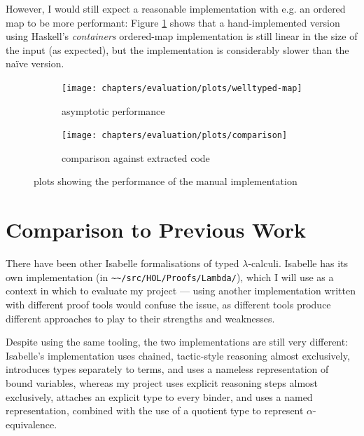 However, I would still expect a reasonable implementation with e.g. an ordered map to be more performant: Figure \ref{fig:results-map} shows that a hand-implemented version using Haskell's \emph{containers} ordered-map implementation is still linear in the size of the input (as expected), but the implementation is considerably slower than the na\"ive version.

\begin{figure}
\begin{subfigure}{.49\textwidth}
 \centering
 \texttt{[image: chapters/evaluation/plots/welltyped-map]}
 \caption{asymptotic performance}
\end{subfigure}
\begin{subfigure}{.49\textwidth}
 \centering
 \texttt{[image: chapters/evaluation/plots/comparison]}
 \caption{comparison against extracted code}
\end{subfigure}
\caption{plots showing the performance of the manual implementation}
\label{fig:results-map}
\end{figure}

\section{Comparison to Previous Work}
There have been other Isabelle formalisations of typed \(\lambda\)-calculi.
Isabelle has its own implementation (in \texttt{\textasciitilde\textasciitilde/src/HOL/Proofs/Lambda/}), which I will use as a context in which to evaluate my project --- using another implementation written with different proof tools would confuse the issue, as different tools produce different approaches to play to their strengths and weaknesses.

Despite using the same tooling, the two implementations are still very different: Isabelle's implementation uses chained, tactic-style reasoning almost exclusively, introduces types separately to terms, and uses a nameless representation of bound variables, whereas my project uses explicit reasoning steps almost exclusively, attaches an explicit type to every binder, and uses a named representation, combined with the use of a quotient type to represent \(\alpha\)-equivalence.

